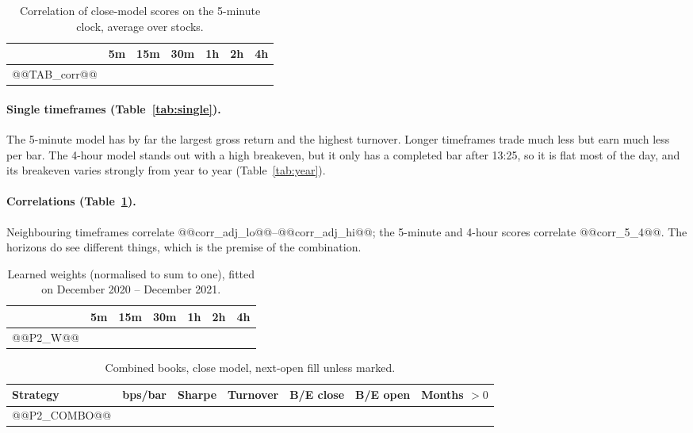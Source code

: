 \documentclass[11pt,a4paper]{article}
\begin{document}
\begin{table}[htbp]
\centering
\caption{Correlation of close-model scores on the 5-minute clock, average over stocks.}
\label{tab:corr}
\small
\begin{tabular}{@{}lrrrrrr@{}}
\toprule
& 5m & 15m & 30m & 1h & 2h & 4h \\
\midrule
@@TAB_corr@@
\bottomrule
\end{tabular}
\end{table}

\paragraph{Single timeframes (Table~\ref{tab:single}).} The 5-minute model has by far the largest gross
return and the highest turnover. Longer timeframes trade much less but earn much less per bar. The 4-hour
model stands out with a high breakeven, but it only has a completed bar after 13:25, so it is flat most
of the day, and its breakeven varies strongly from year to year (Table~\ref{tab:year}).

\paragraph{Correlations (Table~\ref{tab:corr}).} Neighbouring timeframes correlate
@@corr_adj_lo@@--@@corr_adj_hi@@; the 5-minute and 4-hour scores correlate @@corr_5_4@@. The horizons do see
different things, which is the premise of the combination.

\begin{table}[htbp]
\centering
\caption{Learned weights (normalised to sum to one), fitted on December 2020 -- December 2021.}
\label{tab:w}
\small
\begin{tabular}{@{}lrrrrrr@{}}
\toprule
& 5m & 15m & 30m & 1h & 2h & 4h \\
\midrule
@@P2_W@@
\bottomrule
\end{tabular}
\end{table}

\begin{table}[htbp]
\centering
\caption{Combined books, close model, next-open fill unless marked.}
\label{tab:combo}
\small
\begin{tabular}{@{}lrrrrrr@{}}
\toprule
Strategy & bps/bar & Sharpe & Turnover & B/E close & B/E open & Months $>0$ \\
\midrule
@@P2_COMBO@@
\bottomrule
\end{tabular}
\end{table}
\end{document}

